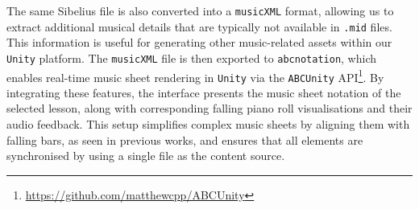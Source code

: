 \documentclass{vgtc}                          %
\begin{document}
\par %
The same Sibelius file is also converted into a \texttt{musicXML} format, allowing us to extract additional musical details that are typically not available in \texttt{.mid} files. This information is useful for generating other music-related assets within our \texttt{Unity} platform. The \texttt{musicXML} file is then exported to \texttt{abcnotation}, which enables real-time music sheet rendering in \texttt{Unity} via the \texttt{ABCUnity} API\footnote{\url{https://github.com/matthewcpp/ABCUnity}}. By integrating these features, the interface presents the music sheet notation of the selected lesson, along with corresponding falling piano roll visualisations and their audio feedback. This setup simplifies complex music sheets by aligning them with falling bars, as seen in previous works, and ensures that all elements are synchronised by using a single file as the content source.



\end{document}
